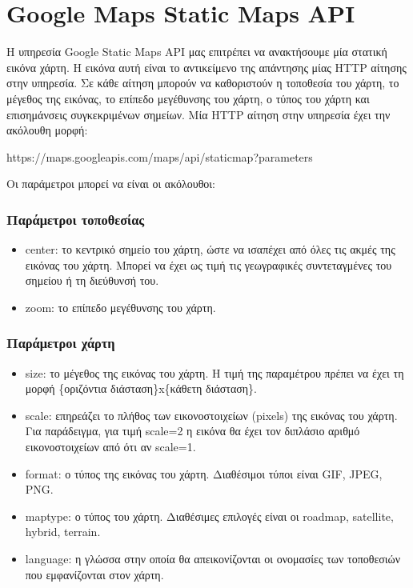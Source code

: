 \section{Google Maps Static Maps API}

Η υπηρεσία Google Static Maps API μας επιτρέπει να ανακτήσουμε μία στατική εικόνα χάρτη. Η εικόνα αυτή είναι το αντικείμενο της απάντησης μίας HTTP αίτησης στην υπηρεσία. 
Σε κάθε αίτηση μπορούν να καθοριστούν η τοποθεσία του χάρτη, το μέγεθος της εικόνας, το επίπεδο μεγέθυνσης του χάρτη, ο τύπος του χάρτη και επισημάνσεις συγκεκριμένων 
σημείων. Μία HTTP αίτηση στην υπηρεσία έχει την ακόλουθη μορφή:
\begin{center}
 https://maps.googleapis.com/maps/api/staticmap?parameters
\end{center}

Οι παράμετροι μπορεί να είναι οι ακόλουθοι:

\subsubsection{Παράμετροι τοποθεσίας}

\begin{itemize}
 \item center: το κεντρικό σημείο του χάρτη, ώστε να ισαπέχει από όλες τις ακμές της εικόνας του χάρτη. Μπορεί να έχει ως τιμή τις γεωγραφικές συντεταγμένες 
 του σημείου ή τη διεύθυνσή του.
 \item zoom: το επίπεδο μεγέθυνσης του χάρτη.
\end{itemize}

\subsubsection{Παράμετροι χάρτη}

\begin{itemize}
 \item size: το μέγεθος της εικόνας του χάρτη. Η τιμή της παραμέτρου πρέπει να έχει τη μορφή \{οριζόντια διάσταση\}x\{κάθετη διάσταση\}.
 \item scale: επηρεάζει το πλήθος των εικονοστοιχείων (pixels) της εικόνας του χάρτη. Για παράδειγμα, για τιμή scale=2 η εικόνα θα έχει τον διπλάσιο αριθμό εικονοστοιχείων 
 από ότι αν scale=1.
 \item format: ο τύπος της εικόνας του χάρτη. Διαθέσιμοι τύποι είναι GIF, JPEG, PNG. 
 \item maptype: ο τύπος του χάρτη. Διαθέσιμες επιλογές είναι οι roadmap, satellite, hybrid, terrain. 
 \item language: η γλώσσα στην οποία θα απεικονίζονται οι ονομασίες των τοποθεσιών που εμφανίζονται στον χάρτη.
\end{itemize}

